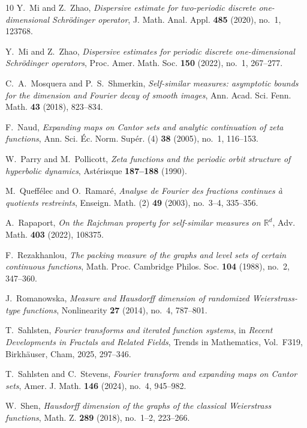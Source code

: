 \documentclass[11pt]{amsart}
\theoremstyle{plain}
\theoremstyle{definition}
\numberwithin{equation}{section}
\begin{document}
\begin{thebibliography}{10}
Y.~Mi and Z.~Zhao,
\emph{Dispersive estimate for two-periodic discrete one-dimensional Schr\"odinger operator},
J. Math. Anal. Appl. \textbf{485} (2020), no.~1, 123768.

Y.~Mi and Z.~Zhao,
\emph{Dispersive estimates for periodic discrete one-dimensional Schr\"odinger operators},
Proc. Amer. Math. Soc. \textbf{150} (2022), no.~1, 267--277.

C.~A.~Mosquera and P.~S.~Shmerkin,
\emph{Self-similar measures: asymptotic bounds for the dimension and Fourier decay of smooth images},
Ann. Acad. Sci. Fenn. Math. \textbf{43} (2018), 823--834.

F.~Naud,
\emph{Expanding maps on Cantor sets and analytic continuation of zeta functions},
Ann. Sci. \'Ec. Norm. Sup\'er. (4) \textbf{38} (2005), no.~1, 116--153.

W.~Parry and M.~Pollicott,
\emph{Zeta functions and the periodic orbit structure of hyperbolic dynamics},
Ast\'erisque \textbf{187--188} (1990).

M.~Queff\'elec and O.~Ramar\'e,
\emph{Analyse de Fourier des fractions continues \`a quotients restreints},
Enseign. Math. (2) \textbf{49} (2003), no.~3--4, 335--356.

A.~Rapaport,
\emph{On the Rajchman property for self-similar measures on $\mathbb{R}^d$},
Adv. Math. \textbf{403} (2022), 108375.

F.~Rezakhanlou,
\emph{The packing measure of the graphs and level sets of certain continuous functions},
Math. Proc. Cambridge Philos. Soc. \textbf{104} (1988), no.~2, 347--360.

J.~Romanowska,
\emph{Measure and Hausdorff dimension of randomized Weierstrass-type functions},
Nonlinearity \textbf{27} (2014), no.~4, 787--801.

T.~Sahlsten,
\emph{Fourier transforms and iterated function systems},
in \emph{Recent Developments in Fractals and Related Fields},
Trends in Mathematics, Vol.~F319,
Birkh\"auser, Cham, 2025, 297--346.

T.~Sahlsten and C.~Stevens,
\emph{Fourier transform and expanding maps on Cantor sets},
Amer. J. Math. \textbf{146} (2024), no.~4, 945--982.

W.~Shen,
\emph{Hausdorff dimension of the graphs of the classical Weierstrass functions},
Math. Z. \textbf{289} (2018), no.~1--2, 223--266.


\end{thebibliography}
\end{document}
